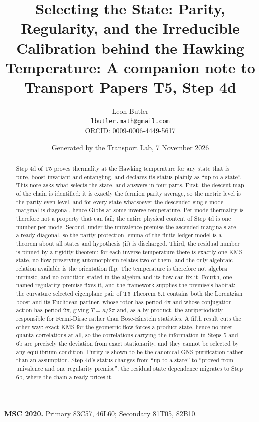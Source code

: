 \documentclass[11pt]{article}
\title{\bfseries Selecting the State: Parity, Regularity, and the Irreducible Calibration behind the Hawking Temperature: A companion note to Transport Papers T5, Step 4d}
\author{Leon Butler\\ \normalsize\href{mailto:lbutler.math@gmail.com}{\texttt{lbutler.math@gmail.com}}\\ \normalsize ORCID: \href{https://orcid.org/0009-0006-4449-5617}{0009-0006-4449-5617}}
\date{Generated by the Transport Lab, 7 November 2026}
\theoremstyle{definition}
\theoremstyle{plain}
\begin{document}
\maketitle
\begin{abstract}
\normalsize
Step 4d of T5 proves thermality at the Hawking temperature for any state that is pure, boost invariant and entangling, and declares its status plainly as ``up to a state''. This note asks what selects the state, and answers in four parts. First, the descent map of the chain is identified: it is exactly the fermion parity average, so the metric level is the parity even level, and for every state whatsoever the descended single mode marginal is diagonal, hence Gibbs at some inverse temperature. Per mode thermality is therefore not a property that can fail; the entire physical content of Step 4d is one number per mode. Second, under the univalence premise the ascended marginals are already diagonal, so the parity protection lemma of the finite ledger model is a theorem about all states and hypothesis (ii) is discharged. Third, the residual number is pinned by a rigidity theorem: for each inverse temperature there is exactly one KMS state, no flow preserving automorphism relates two of them, and the only algebraic relation available is the orientation flip. The temperature is therefore not algebra intrinsic, and no condition stated in the algebra and its flow can fix it. Fourth, one named regularity premise fixes it, and the framework supplies the premise's habitat: the curvature selected eigenplane pair of T5 Theorem 6.1 contains both the Lorentzian boost and its Euclidean partner, whose rotor has period $4\pi$ and whose conjugation action has period $2\pi$, giving $T = \kappa/2\pi$ and, as a by-product, the antiperiodicity responsible for Fermi-Dirac rather than Bose-Einstein statistics. A fifth result cuts the other way: exact KMS for the geometric flow forces a product state, hence no inter-quanta correlations at all, so the correlations carrying the information in Steps 5 and 6b are precisely the deviation from exact stationarity, and they cannot be selected by any equilibrium condition. Purity is shown to be the canonical GNS purification rather than an assumption. Step 4d's status changes from ``up to a state'' to ``proved from univalence and one regularity premise''; the residual state dependence migrates to Step 6b, where the chain already prices it.
\end{abstract}
\medskip
\noindent\textbf{MSC 2020.} Primary 83C57, 46L60; Secondary 81T05, 82B10.\\
\end{document}
